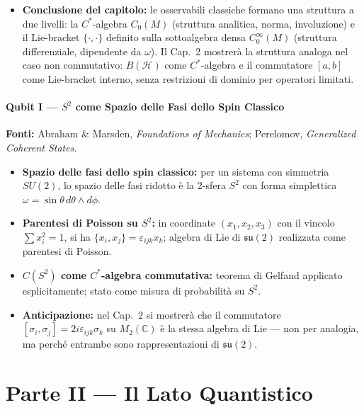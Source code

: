 \documentclass[12pt, a4paper]{article}
\newcommand{\fonti}[1]{%
	\begin{fontebox}
		\textcolor{fontecolor}{\footnotesize\textbf{Fonti:} #1}
	\end{fontebox}%
}
\begin{document}
\begin{itemize}
	\item \textbf{Conclusione del capitolo:} le osservabili classiche formano
	una struttura a due livelli: la $C^*$-algebra $C_0(M)$ (struttura analitica,
	norma, involuzione) e il Lie-bracket $\{\cdot,\cdot\}$ definito sulla sottoalgebra
	densa $C_0^\infty(M)$ (struttura differenziale, dipendente da $\omega$). Il
	Cap.\ 2 mostrerà la struttura analoga nel caso non commutativo: $B(\mathcal{H})$
	come $C^*$-algebra e il commutatore $[a,b]$ come Lie-bracket interno, senza
	restrizioni di dominio per operatori limitati.
\end{itemize}
	
	\subsection{Qubit I --- $S^2$ come Spazio delle Fasi dello Spin Classico}
	
	\fonti{Abraham \& Marsden, \textit{Foundations of Mechanics}; Perelomov,
		\textit{Generalized Coherent States}.}
	
	\begin{itemize}
		\item \textbf{Spazio delle fasi dello spin classico:} per un sistema con simmetria
		$SU(2)$, lo spazio delle fasi ridotto è la 2-sfera $S^2$ con forma simplettica
		$\omega = \sin\theta\, d\theta \wedge d\phi$.
		\item \textbf{Parentesi di Poisson su $S^2$:} in coordinate $(x_1, x_2, x_3)$
		con il vincolo $\sum x_i^2 = 1$, si ha $\{x_i, x_j\} = \varepsilon_{ijk} x_k$;
		algebra di Lie di $\mathfrak{su}(2)$ realizzata come parentesi di Poisson.
		\item \textbf{$C(S^2)$ come $C^*$-algebra commutativa:} teorema di Gelfand applicato
		esplicitamente; stato come misura di probabilità su $S^2$.
		\item \textbf{Anticipazione:} nel Cap.\ 2 si mostrerà che il commutatore
		$[\sigma_i, \sigma_j] = 2i\varepsilon_{ijk}\sigma_k$ su $M_2(\mathbb{C})$ è la
		stessa algebra di Lie --- non per analogia, ma perché entrambe sono rappresentazioni
		di $\mathfrak{su}(2)$.
	\end{itemize}
	
	\newpage
	\part*{Parte II --- Il Lato Quantistico}
	
\end{document}
